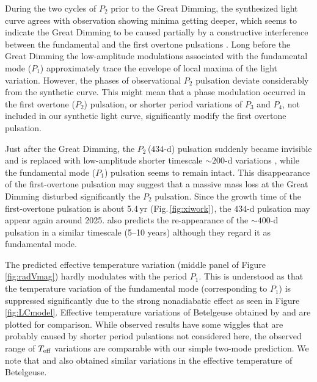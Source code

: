 \documentclass[fleqn,usenatbib]{mnras}
\begin{document}
During the two cycles of $P_2$ prior to the Great Dimming, the synthesized light curve
agrees with observation showing minima getting deeper, 
which seems to indicate the Great Dimming to be caused partially
by a constructive interference between the fundamental and the first overtone
pulsations \citep{Guinan2019,Harper2020}.  
Long before the Great Dimming the low-amplitude modulations 
associated with the fundamental mode ($P_1$) approximately trace the envelope
of local maxima of the light variation. 
However, the phases of observational $P_2$ pulsation deviate considerably from the synthetic curve. 
This might mean that a phase modulation occurred  in the first overtone ($P_2$) 
pulsation, or shorter period variations of $P_3$ and $P_4$,  
not included in our synthetic light curve, significantly modify the first overtone pulsation.

Just after the Great Dimming, the $P_2$\,($434$-d) pulsation suddenly became invisible  
and is replaced with low-amplitude shorter timescale $\sim200$-d variations
 \citep{Dupree2022,Jadlovsky2023}, while the fundamental mode ($P_1$) pulsation
seems to remain intact.
This disappearance of the first-overtone pulsation may 
suggest that a massive mass loss \citep{Jadlovsky2023,Dupree2022} 
at the Great Dimming disturbed significantly the $P_2$ pulsation.
Since the growth time of the first-overtone  
pulsation is about 5.4\,yr (Fig.\,\ref{fig:xiwork}), 
the $434$-d pulsation may appear again around 2025.
\citet{MacLeod2023} also predicts the re-appearance of the $\sim400$-d pulsation 
in a similar timescale (5--10 years) although they regard it as fundamental mode.

The predicted effective temperature variation (middle panel of
 Figure\,\ref{fig:radVmag}) hardly  modulates with the period $P_1$. 
This is understood as that the temperature
variation of the fundamental mode (corresponding to $P_1$) is suppressed 
significantly due to the
strong nonadiabatic effect as seen in Figure\,\ref{fig:LCmodel}.
Effective temperature variations of Betelgeuse obtained by
\citet{Harper2020} and \citet{Taniguchi2022} are plotted for comparison.
While observed results have some wiggles that are probably caused by shorter 
period pulsations not considered here, the observed range of $T_{\rm eff}$ 
variations are comparable with our simple two-mode prediction.   
We note that \citet{Wasatonic2022} and \citet{Mittag2023} also obtained similar variations in the
effective temperature of Betelgeuse.   
\end{document}
